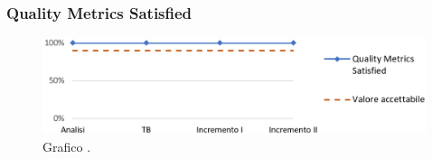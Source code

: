 \subsubsection{Quality Metrics Satisﬁed}
\begin{figure}[h]
	\centering
	\includegraphics[width=16cm]{Images/metriche}
	\caption{Graﬁco .}
\end{figure}


